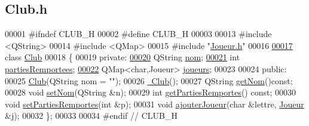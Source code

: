\hypertarget{_club_8h_source}{}\subsection{Club.\+h}

\begin{DoxyCode}
00001 \textcolor{preprocessor}{#ifndef CLUB\_H}
00002 \textcolor{preprocessor}{#define CLUB\_H}
00003 
00013 \textcolor{preprocessor}{#include <QString>}
00014 \textcolor{preprocessor}{#include <QMap>}
00015 \textcolor{preprocessor}{#include "\hyperlink{_joueur_8h}{Joueur.h}"}
00016 
\hyperlink{class_club}{00017} \textcolor{keyword}{class }\hyperlink{class_club}{Club}
00018 \{
00019 \textcolor{keyword}{private}:
\hyperlink{class_club_a18e1489d02110a82a0c8706f52091002}{00020}     QString \hyperlink{class_club_a18e1489d02110a82a0c8706f52091002}{nom};
\hyperlink{class_club_a1c5dd1362656cb4829de483255ffc39a}{00021}     \textcolor{keywordtype}{int} \hyperlink{class_club_a1c5dd1362656cb4829de483255ffc39a}{partiesRemportees};
\hyperlink{class_club_a1546f281ba72a07e52cbfd2a60af699b}{00022}     QMap<char,Joueur> \hyperlink{class_club_a1546f281ba72a07e52cbfd2a60af699b}{joueurs};
00023 
00024 \textcolor{keyword}{public}:
00025     \hyperlink{class_club_a6d6fa5971608a06394c40453289d6251}{Club}(QString nom = \textcolor{stringliteral}{""});
00026     \hyperlink{class_club_a1c2993e141cfa6468284274359cc7de5}{~Club}();
00027     QString \hyperlink{class_club_aaa3c96659bf305d7a1988ecbd27de30f}{getNom}()\textcolor{keyword}{const};
00028     \textcolor{keywordtype}{void} \hyperlink{class_club_a6cb8e81d8cfd3d5febd6ce48e33ba94e}{setNom}(QString &n);
00029     \textcolor{keywordtype}{int} \hyperlink{class_club_af4f28219aa51c3742cddfae4b66cec4b}{getPartiesRemportes}() \textcolor{keyword}{const};
00030     \textcolor{keywordtype}{void} \hyperlink{class_club_ad1711f2742e385ef00174b3ebd98b165}{setPartiesRemportes}(\textcolor{keywordtype}{int} &p);
00031     \textcolor{keywordtype}{void} \hyperlink{class_club_af7cf902fc29f6d587b11a10eec87edff}{ajouterJoueur}(\textcolor{keywordtype}{char} &lettre, \hyperlink{class_joueur}{Joueur} &j);
00032 \};
00033 
00034 \textcolor{preprocessor}{#endif // CLUB\_H}
\end{DoxyCode}
